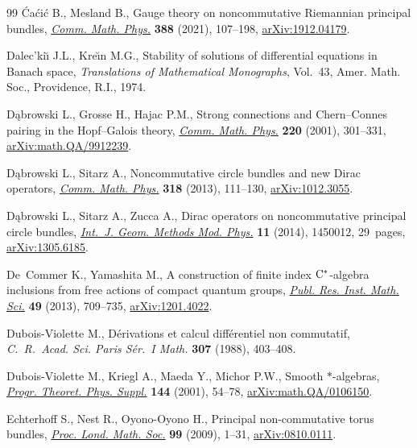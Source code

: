 \begin{thebibliography}{99}
\'Ca\'ci\'c B., Mesland B., Gauge theory on noncommutative {R}iemannian
 principal bundles, \href{https://doi.org/10.1007/s00220-021-04187-8}{\textit{Comm. Math. Phys.}} \textbf{388} (2021), 107--198,
 \href{https://arxiv.org/abs/1912.04179}{arXiv:1912.04179}.

Dalec'ki\u{\i} J.L., Kre\u{\i}n M.G., Stability of solutions of differential
 equations in {B}anach space, \textit{Translations of Mathematical
 Monographs}, Vol.~43, Amer. Math. Soc., Providence, R.I., 1974.

D\k{a}browski L., Grosse H., Hajac P.M., Strong connections and
 {C}hern--{C}onnes pairing in the {H}opf--{G}alois theory, \href{https://doi.org/10.1007/s002200100433}{\textit{Comm. Math.
 Phys.}} \textbf{220} (2001), 301--331, \href{https://arxiv.org/abs/math.QA/9912239}{arXiv:math.QA/9912239}.

D\k{a}browski L., Sitarz A., Noncommutative circle bundles and new {D}irac
 operators, \href{https://doi.org/10.1007/s00220-012-1550-8}{\textit{Comm. Math. Phys.}} \textbf{318} (2013), 111--130,
 \href{https://arxiv.org/abs/1012.3055}{arXiv:1012.3055}.

D\k{a}browski L., Sitarz A., Zucca A., Dirac operators on noncommutative
 principal circle bundles, \href{https://doi.org/10.1142/S0219887814500121}{\textit{Int.~J. Geom. Methods Mod. Phys.}}
 \textbf{11} (2014), 1450012, 29~pages, \href{https://arxiv.org/abs/1305.6185}{arXiv:1305.6185}.

De~Commer K., Yamashita M., A construction of finite index {${\rm
 C}^*$}-algebra inclusions from free actions of compact quantum groups,
 \href{https://doi.org/10.4171/PRIMS/117}{\textit{Publ. Res. Inst. Math. Sci.}} \textbf{49} (2013), 709--735,
 \href{https://arxiv.org/abs/1201.4022}{arXiv:1201.4022}.

Dubois-Violette M., D\'erivations et calcul diff\'erentiel non commutatif,
 \textit{C.~R.~Acad. Sci. Paris S\'er.~I Math.} \textbf{307} (1988), 403--408.

Dubois-Violette M., Kriegl A., Maeda Y., Michor P.W., Smooth {$*$}-algebras,
 \href{https://doi.org/10.1143/PTPS.144.54}{\textit{Progr. Theoret. Phys. Suppl.}} \textbf{144} (2001), 54--78,
 \href{https://arxiv.org/abs/math.QA/0106150}{arXiv:math.QA/0106150}.

Echterhoff S., Nest R., Oyono-Oyono H., Principal non-commutative torus
 bundles, \href{https://doi.org/10.1112/plms/pdn050}{\textit{Proc. Lond. Math. Soc.}} \textbf{99} (2009), 1--31,
 \href{https://arxiv.org/abs/0810.0111}{arXiv:0810.0111}.


\end{thebibliography}
